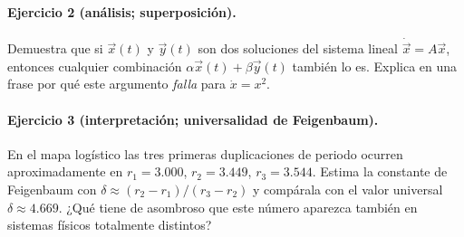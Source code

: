 \paragraph{Ejercicio 2 (análisis; superposición).} Demuestra que si $\vec{x}(t)$ y $\vec{y}(t)$ son dos soluciones del sistema lineal $\dot{\vec{x}}=A\vec{x}$, entonces cualquier combinación $\alpha\vec{x}(t)+\beta\vec{y}(t)$ también lo es. Explica en una frase por qué este argumento \emph{falla} para $\dot{x}=x^2$.

\paragraph{Ejercicio 3 (interpretación; universalidad de Feigenbaum).} En el mapa logístico las tres primeras duplicaciones de periodo ocurren aproximadamente en $r_1=3.000$, $r_2=3.449$, $r_3=3.544$. Estima la constante de Feigenbaum con $\delta\approx (r_2-r_1)/(r_3-r_2)$ y compárala con el valor universal $\delta\approx 4.669$. ¿Qué tiene de asombroso que este número aparezca también en sistemas físicos totalmente distintos?

